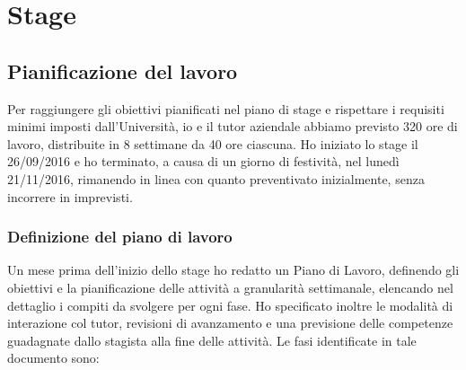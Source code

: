 
\chapter{Stage}
\label{cap:stage}


\section{Pianificazione del lavoro}

Per raggiungere gli obiettivi pianificati nel piano di stage e rispettare i requisiti minimi imposti dall'Università, io e il tutor aziendale abbiamo previsto 320 ore di lavoro, distribuite in 8 settimane da 40 ore ciascuna. Ho iniziato lo stage il 26/09/2016 e ho terminato, a causa di un giorno di festività, nel lunedì 21/11/2016, rimanendo in linea con quanto preventivato inizialmente, senza incorrere in imprevisti.

	\subsection{Definizione del piano di lavoro}
	
	Un mese prima dell'inizio dello stage ho redatto un Piano di Lavoro, definendo gli obiettivi e la pianificazione delle attività a granularità settimanale, elencando nel dettaglio i compiti da svolgere per ogni fase. Ho specificato inoltre le modalità di interazione col tutor, revisioni di avanzamento e una previsione delle competenze guadagnate dallo stagista alla fine delle attività. Le fasi identificate in tale documento sono:
	
